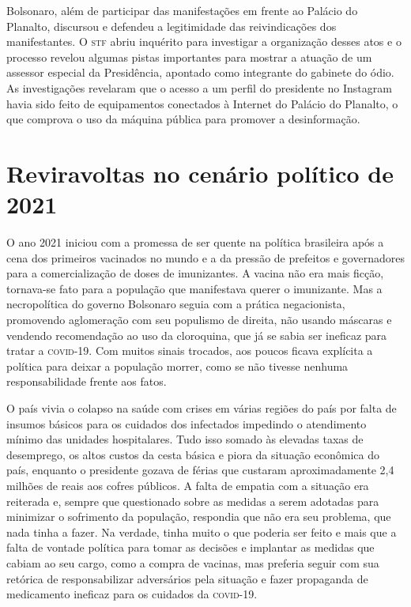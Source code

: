 Bolsonaro, além de participar das manifestações em frente ao Palácio do
Planalto, discursou e defendeu a legitimidade das reivindicações dos
manifestantes. O \textsc{stf} abriu inquérito para investigar a organização
desses atos e o processo revelou algumas pistas importantes para mostrar
a atuação de um assessor especial da Presidência, apontado como
integrante do gabinete do ódio. As investigações revelaram que o acesso a um
perfil do presidente no Instagram havia sido feito de equipamentos
conectados à Internet do Palácio do Planalto, o que comprova o uso da
máquina pública para promover a desinformação.

\section{Reviravoltas no cenário político de 2021}

O ano 2021 iniciou com a promessa de ser quente na política brasileira
após a cena dos primeiros vacinados no mundo e a da pressão de prefeitos e
governadores para a comercialização de doses de imunizantes. A vacina
não era mais ficção, tornava-se fato para a população que manifestava
querer o imunizante. Mas a necropolítica do governo Bolsonaro seguia com
a prática negacionista, promovendo aglomeração com seu populismo de
direita, não usando máscaras e vendendo recomendação ao uso da
cloroquina, que já se sabia ser ineficaz para tratar a \textsc{covid-19}. Com
muitos sinais trocados, aos poucos ficava explícita a política para
deixar a população morrer, como se não tivesse nenhuma responsabilidade
frente aos fatos.

O país vivia o colapso na saúde com crises em várias regiões do país por
falta de insumos básicos para os cuidados dos infectados impedindo o
atendimento mínimo das unidades hospitalares. Tudo isso somado às
elevadas taxas de desemprego, os altos custos da cesta básica e piora da
situação econômica do país, enquanto o presidente gozava de férias que
custaram aproximadamente 2,4 milhões de reais aos cofres públicos. A falta de
empatia com a situação era reiterada e, sempre que questionado sobre
as medidas a serem adotadas para minimizar o sofrimento da população,
respondia que não era seu problema, que nada tinha a fazer. Na verdade,
tinha muito o que poderia ser feito e mais que a falta de vontade
política para tomar as decisões e implantar as medidas que cabiam ao seu
cargo, como a compra de vacinas, mas preferia seguir com sua retórica de
responsabilizar adversários pela situação e fazer propaganda de
medicamento ineficaz para os cuidados da \textsc{covid-19}.

